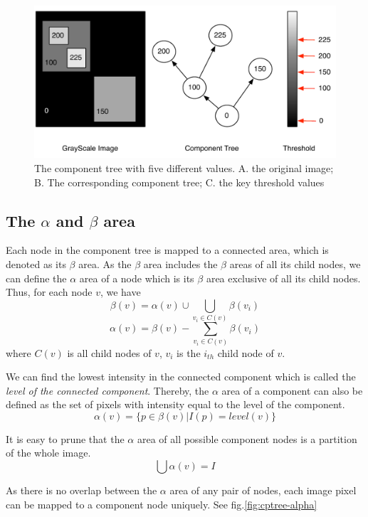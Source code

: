 \begin{figure}[htbp]
\centering
\includegraphics[width=1.0\textwidth]{images/cptree_example}
\caption{The component tree with five different values. A. the original image; B. The corresponding component tree; C. the key threshold values}
\label{fig:cptree-example}
\end{figure}
\subsection{The $\alpha$ and $\beta$ area}
Each node in the component tree is mapped to a connected area, which is denoted as its $\beta$ area. As the $\beta$ area includes the $\beta$ areas of all its child nodes, we can define the $\alpha$ area of a node which is its $\beta$ area exclusive of all its child nodes. Thus, for each node $v$, we have
$$
\beta(v) = \alpha(v)\cup\bigcup_{v_i \in C(v)} \beta(v_i)   
$$
$$
\alpha(v) = \beta(v) - \sum_{v_i\in C(v)}\beta(v_i)
$$
where $C(v)$ is all child nodes of $v$, $v_i$ is the $i_{th}$ child node of $v$. 

We can find the lowest intensity in the connected component which is called the \emph{level of the connected component}. Thereby, the $\alpha$ area of a component can also be defined as the set of pixels with intensity equal to the level of the component.
$$
\alpha(v) = \{p \in \beta(v)| I(p) = level(v)\}
$$

It is easy to prune that the $\alpha$ area of all possible component nodes is a partition of the whole image.
$$
\bigcup \alpha(v) = I
$$

As there is no overlap between the $\alpha$ area of any pair of nodes, each image pixel can be mapped to a component node uniquely. See fig.\ref{fig:cptree-alpha}

